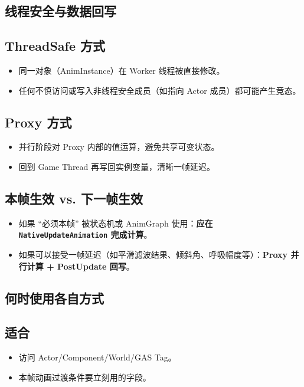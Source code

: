 \documentclass[10pt,openright,oneside,CJKmath]{MyBook}
\begin{document}
\subsection{线程安全与数据回写}
\subsection*{ThreadSafe 方式}
\begin{itemize}
  \item 同一对象（AnimInstance）在 Worker 线程被直接修改。
  \item 任何不慎访问或写入非线程安全成员（如指向 Actor 成员）都可能产生竞态。
\end{itemize}

\subsection*{Proxy 方式}
\begin{itemize}
  \item 并行阶段对 Proxy 内部的值运算，避免共享可变状态。
  \item {} 回到 Game Thread 再写回实例变量，清晰一帧延迟。
\end{itemize}

\subsection{本帧生效 vs. 下一帧生效}
\begin{itemize}
  \item 如果 “必须本帧” 被状态机或 AnimGraph 使用：\textbf{应在 \texttt{NativeUpdateAnimation} 完成计算}。
  \item 如果可以接受一帧延迟（如平滑滤波结果、倾斜角、呼吸幅度等）：\textbf{Proxy 并行计算 + PostUpdate 回写}。
\end{itemize}

\subsection{何时使用各自方式}
\subsection*{适合 }
\begin{itemize}
  \item 访问 Actor/Component/World/GAS Tag。
  \item 本帧动画过渡条件要立刻用的字段。
\end{itemize}
\end{document}
